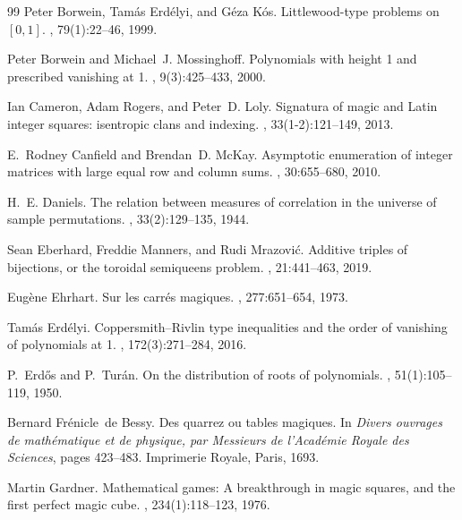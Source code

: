 \documentclass[11pt,a4paper]{article}
\theoremstyle{plain}
\theoremstyle{definition}
\theoremstyle{remark}
\begin{document}
\begin{thebibliography}{99}
Peter Borwein, Tam{\'a}s Erd{\'e}lyi, and G{\'e}za K{\'o}s.
\newblock Littlewood-type problems on $[0,1]$.
,
  79(1):22--46, 1999.

Peter Borwein and Michael~J. Mossinghoff.
\newblock Polynomials with height 1 and prescribed vanishing at 1.
, 9(3):425--433, 2000.

Ian Cameron, Adam Rogers, and Peter~D. Loly.
\newblock Signatura of magic and {L}atin integer squares: isentropic clans and
  indexing.
,
  33(1-2):121--149, 2013.

E.~Rodney Canfield and Brendan~D. McKay.
\newblock Asymptotic enumeration of integer matrices with large equal row and
  column sums.
, 30:655--680, 2010.

H.~E. Daniels.
\newblock The relation between measures of correlation in the universe of
  sample permutations.
, 33(2):129--135, 1944.

Sean Eberhard, Freddie Manners, and Rudi Mrazovi{\'c}.
\newblock Additive triples of bijections, or the toroidal semiqueens problem.
, 21:441--463,
  2019.

Eug{\`e}ne Ehrhart.
\newblock Sur les carr{\'e}s magiques.
,
  277:651--654, 1973.

Tam{\'a}s Erd{\'e}lyi.
\newblock Coppersmith--{R}ivlin type inequalities and the order of vanishing of
  polynomials at 1.
, 172(3):271--284, 2016.

P.~Erd{\H o}s and P.~Tur{\'a}n.
\newblock On the distribution of roots of polynomials.
, 51(1):105--119, 1950.

Bernard Fr{\'e}nicle~de Bessy.
\newblock Des quarrez ou tables magiques.
\newblock In {\em Divers ouvrages de math{\'e}matique et de physique, par
  Messieurs de l'Acad{\'e}mie Royale des Sciences}, pages 423--483. Imprimerie
  Royale, Paris, 1693.

Martin Gardner.
\newblock Mathematical games: A breakthrough in magic squares, and the first
  perfect magic cube.
, 234(1):118--123, 1976.


\end{thebibliography}
\end{document}
